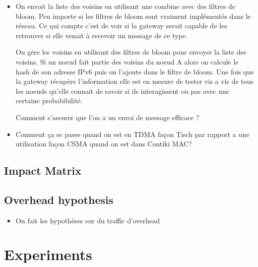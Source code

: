 \lipsum

\begin{itemize}

    \item On envoit la liste des voisins en utilisant une combine avec des
      filtres de bloom. Peu importe si les filtres de bloom sont vraiment
      implémentés dans le réseau. Ce qui compte c'est de voir si la gateway
      serait capable de les retrouver si elle venait à recevoir un message de
      ce type.

      On gère les voisins en utilisant des filtres de bloom pour envoyer la
      liste des voisins. Si un noeud fait partie des voisins du noeud A alors
      on calcule le hash de son adresse IPv6 puis on l'ajoute dans le filtre
      de bloom. Une fois que la gateway récupère l'information elle est en
      mesure de tester vis a vis de tous les noeuds qu'elle connait de savoir
      si ils interagissent ou pas avec une certaine probabibilité.

      Comment s'assurer que l'on a un envoi de message efficace ?

      \item Comment ça se passe quand on est en TDMA façon Tisch par rapport
      a une utilisation façon CSMA quand on est dans Contiki MAC?

\end{itemize}

\subsection{Impact Matrix} %
\label{sub:impact_matrix}

\lipsum


\subsection{Overhead hypothesis} %
\label{sub:overhead_hypothesis}

\begin{itemize}
	\item On fait les hypothèses sur du traffic d'overhead
\end{itemize}



\section{Experiments} %
\label{sec:estimators_experiments}

